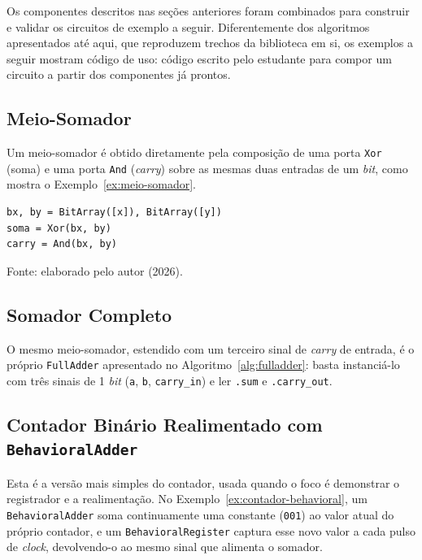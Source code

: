 Os componentes descritos nas seções anteriores foram combinados para construir e validar os circuitos de exemplo a seguir. Diferentemente dos algoritmos apresentados até aqui, que reproduzem trechos da biblioteca em si, os exemplos a seguir mostram código de uso: código escrito pelo estudante para compor um circuito a partir dos componentes já prontos.

\subsection{Meio-Somador}

Um meio-somador é obtido diretamente pela composição de uma porta \texttt{Xor} (soma) e uma porta \texttt{And} (\textit{carry}) sobre as mesmas duas entradas de um \textit{bit}, como mostra o Exemplo~\ref{ex:meio-somador}.

\begin{exemplo}[H]
\caption{Meio-somador composto a partir de Xor e And.}
\label{ex:meio-somador}
\begin{verbatim}
bx, by = BitArray([x]), BitArray([y])
soma = Xor(bx, by)
carry = And(bx, by)
\end{verbatim}
\begin{center}
\footnotesize Fonte: elaborado pelo autor (2026).
\end{center}
\end{exemplo}

\subsection{Somador Completo}

O mesmo meio-somador, estendido com um terceiro sinal de \textit{carry} de entrada, é o próprio \texttt{FullAdder} apresentado no Algoritmo~\ref{alg:fulladder}: basta instanciá-lo com três sinais de 1 \textit{bit} (\texttt{a}, \texttt{b}, \texttt{carry\_in}) e ler \texttt{.sum} e \texttt{.carry\_out}.

\subsection{Contador Binário Realimentado com \texttt{BehavioralAdder}}

Esta é a versão mais simples do contador, usada quando o foco é demonstrar o registrador e a realimentação. No Exemplo~\ref{ex:contador-behavioral}, um \texttt{BehavioralAdder} soma continuamente uma constante (\texttt{001}) ao valor atual do próprio contador, e um \texttt{BehavioralRegister} captura esse novo valor a cada pulso de \textit{clock}, devolvendo-o ao mesmo sinal que alimenta o somador.


